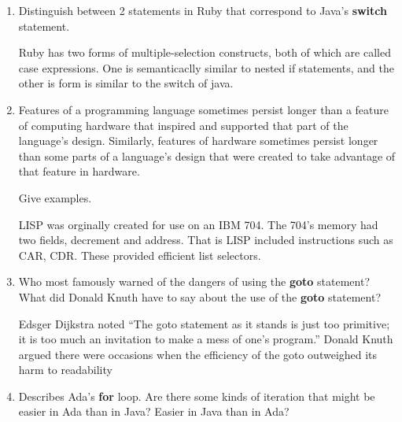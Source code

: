\begin{enumerate}
\begin{answer}
    \end{answer}


  \item Distinguish between 2 statements in Ruby
    that correspond to Java's \textbf{switch} statement.

  \begin{answer}

    Ruby has two forms of multiple-selection constructs, both of which are called case expressions. One is semanticaclly similar to nested if statements, and the other is form is similar to the switch of java.

    \end{answer}


  \item Features of a programming language sometimes persist
    longer than a feature of computing hardware that inspired
    and supported that part of the language's design.
    Similarly, features of hardware sometimes persist longer
    than some parts of a language's design that were created
    to take advantage of that feature in hardware.

    Give examples.

  \begin{answer}

    LISP was orginally created for use on an IBM 704.  The 704's memory had two fields, decrement and address.  That is LISP included instructions such as CAR, CDR. These provided efficient list selectors.

    \end{answer}


  \item Who most famously warned of the dangers of using the
    \textbf{goto} statement? What did Donald Knuth have to
    say about the use of the \textbf{goto} statement?

  \begin{answer}

   Edsger Dijkstra noted “The goto statement as it stands is just too primitive; it is too much an invitation to make a mess of one’s program.” Donald Knuth argued there were occasions when the efficiency of the goto outweighed its harm to readability 

    \end{answer}


  \item Describes Ada's \textbf{for} loop. Are there some
    kinds of iteration that might be easier in Ada than
    in Java? Easier in Java than in Ada?


\end{enumerate}
